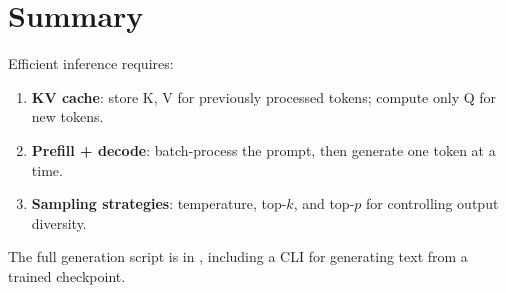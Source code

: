\section{Summary}

Efficient inference requires:
\begin{enumerate}
  \item \textbf{KV cache}: store K, V for previously processed tokens; compute only Q for new tokens.
  \item \textbf{Prefill + decode}: batch-process the prompt, then generate one token at a time.
  \item \textbf{Sampling strategies}: temperature, top-$k$, and top-$p$ for controlling output diversity.
\end{enumerate}

The full generation script is in , including a CLI for generating text from a trained checkpoint.
